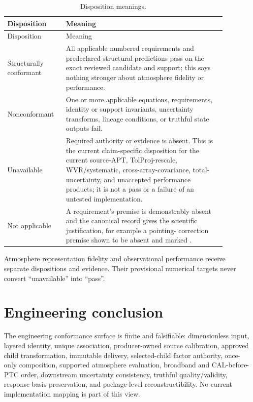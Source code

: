 \documentclass[10pt]{article}
\begin{document}
\begin{longtable}{L{0.22\linewidth}L{0.66\linewidth}}
\caption{Disposition meanings.}\label{tab:eng-disposition}\\
\toprule
Disposition & Meaning \\
\midrule
\endfirsthead
\toprule
Disposition & Meaning \\
\midrule
\endhead
Structurally conformant & All applicable numbered requirements and
predeclared structural predictions pass on the exact reviewed candidate and
support; this says nothing stronger about atmosphere fidelity or performance. \\
Nonconformant & One or more applicable equations, requirements, identity or
support invariants, uncertainty transforms, lineage conditions, or truthful
state outputs fail. \\
Unavailable & Required authority or evidence is absent. This is the current
claim-specific disposition for the current source-APT, TolProj-rescale,
WVR/systematic, cross-array-covariance, total-uncertainty, and unaccepted
performance products; it is not a pass or a failure of an untested
implementation. \\
Not applicable & A requirement's premise is demonstrably absent and the
canonical record gives the scientific justification, for example a pointing-
correction premise shown to be absent and marked . \\
\bottomrule
\end{longtable}

Atmosphere representation fidelity and observational performance receive
separate dispositions and evidence. Their provisional numerical targets never
convert ``unavailable'' into ``pass''.

\section{Engineering conclusion}
\label{sec:eng-conclusion}

The engineering conformance surface is finite and falsifiable: dimensionless
 input,
layered identity, unique association, producer-owned source calibration,
approved child transformation, immutable delivery, selected-child factor
authority, once-only composition, supported atmosphere evaluation, broadband
and CAL-before-PTC order, downstream uncertainty consistency, truthful
quality/validity,
response-basis preservation, and package-level reconstructibility. No current
implementation mapping is part of this view.
\end{document}

